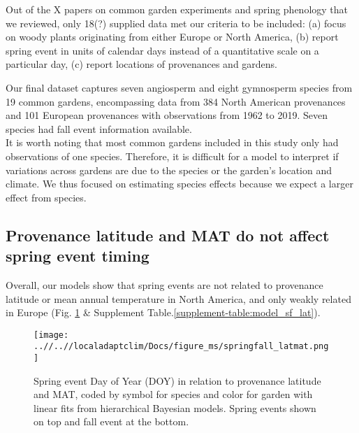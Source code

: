 \documentclass{article}
\begin{document}
Out of the X papers on common garden experiments and spring phenology that we reviewed, only 18(?) supplied data met our criteria to be included: (a) focus on woody plants originating from either Europe or North America, (b) report spring event in units of calendar days instead of a quantitative scale on a particular day, (c) report locations of provenances and gardens. 

Our final dataset captures seven angiosperm and eight gymnosperm species from 19 common gardens, encompassing data from 384 North American provenances and 101 European provenances with observations from 1962 to 2019. Seven species had fall event information available. 
\\
It is worth noting that most common gardens included in this study only had observations of one species. Therefore, it is difficult for a model to interpret if variations across gardens are due to the species or the garden’s location and climate.  We thus focused on estimating species effects because we expect a larger effect from species. 


\subsection{Provenance latitude and MAT do not affect spring event timing}

Overall, our models show that spring events are not related to provenance latitude or mean annual temperature in North America, and only weakly related in Europe (Fig. \ref{figure:springfall_latmat} \& Supplement Table.\ref{supplement-table:model_sf_lat}). 


\begin{figure}[!h] 
    \centering
 \texttt{[image: ..//..//localadaptclim/Docs/figure\_ms/springfall\_latmat.png]}
    \caption{Spring event Day of Year (DOY) in relation to provenance latitude and MAT, coded by symbol for species and color for garden with linear fits from hierarchical Bayesian models. Spring events shown on top and fall event at the bottom.}
    \label{figure:springfall_latmat}
\end{figure}
\end{document}

